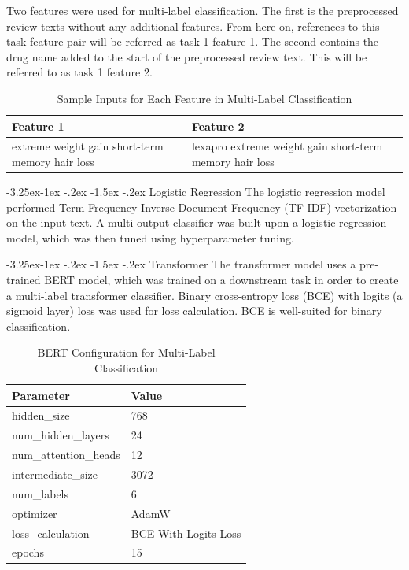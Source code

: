 \documentclass[10.7pt, onecolumn]{article}
\makeatletter
\renewcommand\subsubsection{\@startsection{subsubsection}{3}{\z@}%
	{-3.25ex\@plus -1ex \@minus -.2ex}%
    {-1.5ex \@plus -.2ex}%
    {\normalfont\itshape}}
\makeatother
\begin{document}
Two features were used for multi-label classification. The first is the preprocessed review texts without any additional features. From here on, references to this task-feature pair will be referred as task 1 feature 1. The second contains the drug name added to the start of the preprocessed review text. This will be referred to as task 1 feature 2.

\begin{table}[H]
  \centering
  \small
  \begin{tabular}{|p{5cm}|p{5cm}|p{5cm}|}
    \hline
    \textbf{Feature 1} & \textbf{Feature 2} \\
    \hline
    extreme weight gain short-term memory hair loss & lexapro extreme weight gain short-term memory hair loss\\
    \hline
  \end{tabular}
  \caption{Sample Inputs for Each Feature in Multi-Label Classification}
  \label{tab:multiclassInput}
\end{table}

\subsubsection{Logistic Regression}
The logistic regression model performed Term Frequency Inverse Document Frequency (TF-IDF) vectorization on the input text. A multi-output classifier was built upon a logistic regression model, which was then tuned using hyperparameter tuning.

\subsubsection{Transformer}
The transformer model uses a pre-trained BERT model, which was trained on a downstream task in order to create a multi-label transformer classifier. Binary cross-entropy loss (BCE) with logits (a sigmoid layer) loss was used for loss calculation. BCE is well-suited for binary classification\cite{xu2023learning}. 

\begin{table}[H]
  \centering
  \small
  \begin{tabular}{|p{4cm}|p{4cm}|}
    \hline
    \textbf{Parameter} & \textbf{Value} \\
    \hline
    hidden\_size & 768 \\
    \hline
    num\_hidden\_layers & 24 \\
    \hline
    num\_attention\_heads & 12 \\
    \hline
    intermediate\_size & 3072 \\
    \hline
    num\_labels & 6 \\
    \hline
    optimizer & AdamW \\
    \hline
    loss\_calculation & BCE With Logits Loss \\ 
    \hline
    epochs & 15 \\
    \hline
  \end{tabular}
  \caption{BERT Configuration for Multi-Label Classification}
  \label{tab:task1Parameters}
\end{table}
\end{document}
